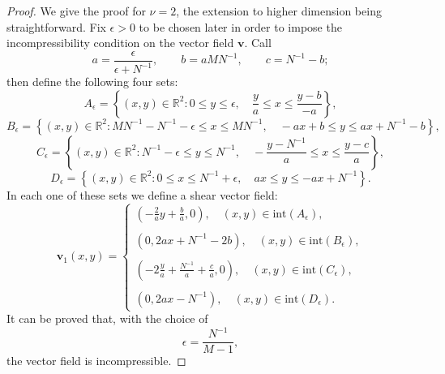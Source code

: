 \documentclass[10pt,a4paper]{amsart}
\begin{document}
\begin{proof}
    We give the proof for $\nu=2$, the extension to higher dimension being straightforward.  Fix $\epsilon>0$ to be chosen later in order to impose the incompressibility condition on the vector field $\mathbf v$. Call
    \begin{equation*}
        a=\frac{\epsilon}{\epsilon+N^{-1}},\qquad b=aMN^{-1},\qquad c=N^{-1}-b;
    \end{equation*}
    then define the following four sets:
     $$A_\epsilon=\left\lbrace (x,y)\in\mathbb R^2: 0\leq y\leq \epsilon,\quad \frac{y}{a}\leq x\leq \frac{y-b}{-a}\right\rbrace,$$
    $$B_\epsilon=\left\lbrace (x,y)\in\mathbb R^2: MN^{-1}-N^{-1}-\epsilon\leq x\leq MN^{-1}, \quad -ax+b\leq y\leq ax+N^{-1}-b\right\rbrace,$$
   $$C_\epsilon=\left\lbrace (x,y)\in\mathbb R^2: N^{-1}-\epsilon\leq y\leq N^{-1}, \quad -\frac{y-N^{-1}}{a}\leq x\leq \frac{y-c}{a}\right\rbrace,$$
    $$D_\epsilon=\left\lbrace (x,y)\in\mathbb R^2: 0\leq  x\leq N^{-1}+\epsilon, \quad ax\leq y\leq -ax+N^{-1}\right\rbrace.$$
    In each one of these sets we define a shear vector field: 
    \begin{equation}\label{eq:vect:field}
        {\mathbf v_1}(x,y)=\begin{cases}
            \left(-\frac{2}{a}y+\frac{b}{a},0\right),\quad (x,y)\in \text{int}(A_\epsilon), \\
            \\
\left(0,2ax+N^{-1}-2b\right),\quad (x,y)\in \text{int}(B_\epsilon), \\
             \\
             \left(-2\frac{y}{a}+\frac{N^{-1}}{a}+\frac{c}{a},0\right),\quad (x,y)\in \text{int}(C_\epsilon), \\
             \\
             \left(0, 2ax-N^{-1}\right),\quad (x,y)\in \text{int}(D_\epsilon). 
        \end{cases}
    \end{equation}
    It can be proved that, with the choice of
   \begin{equation*}
       \epsilon=\frac{N^{-1}}{M-1},
   \end{equation*}
   the vector field is incompressible.

\end{proof}
\end{document}
